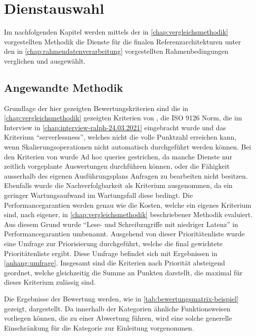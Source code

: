 \chapter{Dienstauswahl}
Im nachfolgenden Kapitel werden mittels der in \autoref{chap:vergleichsmethodik} vorgestellten Methodik die Dienste für die finalen Referenzarchitekturen unter den in \autoref{chap:rahmendatenverarbeitung} vorgestellten Rahmenbedingungen verglichen und ausgewählt.

\section{Angewandte Methodik}

Grundlage der hier gezeigten Bewertungskriterien sind die in \autoref{chap:vergleichsmethodik} gezeigten Kriterien von \citeauthor{Marz.2015}, die ISO 9126 Norm, die im Interview in \autoref{chap:interview-ralph-24.03.2021} eingebracht wurde und das Kriterium \enquote{serverlessness}, welches nicht die volle Punktzahl erreichen kann, wenn Skalierungsoperationen nicht automatisch durchgeführt werden können. Bei den Kriterien von \citeauthor{Marz.2015} wurde Ad hoc queries gestrichen, da manche Dienste nur zeitlich vorgeplante Auswertungen durchführen können, oder die Fähigkeit ausserhalb des eigenen Ausführungsplans Anfragen zu bearbeiten nicht besitzen. Ebenfalls wurde die Nachverfolgbarkeit als Kriterium ausgenommen, da ein geringer Wartungsaufwand im Wartungsfall diese bedingt. Die Performancegarantien werden genau wie die Kosten, welche ein eigenes Kriterium sind, nach eigener, in \autoref{chap:vergleichsmethodik} beschriebener Methodik evaluiert. Aus diesem Grund wurde \enquote{Lese- und Schreibzugriffe mit niedriger Latenz} in Performancegarantien umbenannt. Ausgehend von dieser Prioritätenliste wurde eine Umfrage zur Priorisierung durchgeführt, welche die final gewichtete Prioritätenliste ergibt. Diese Umfrage befindet sich mit Ergebnissen in \autoref{anhang:umfrage}. Insgesamt sind die Kriterien nach Priorität absteigend geordnet, welche gleichzeitig die Summe an Punkten darstellt, die maximal für dieses Kriterium zulässig sind.



Die Ergebnisse der Bewertung werden, wie in \autoref{tab:bewertungsmatrix-beispiel} gezeigt, dargestellt.  Da innerhalb der Kategorien ähnliche Funktionsweisen vorliegen können, die zu einer Abwertung führen, wird eine solche generelle Einschränkung für die Kategorie zur Einleitung vorgenommen.

